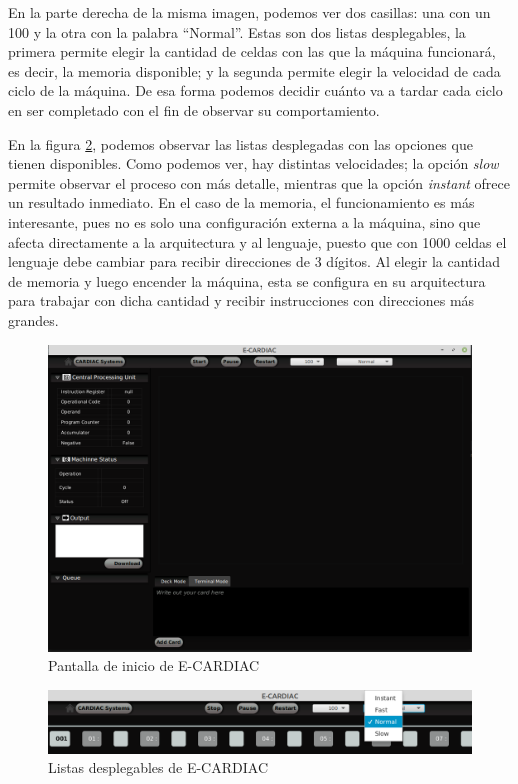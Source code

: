 \documentclass[letterpaper,12pt,oneside]{book}
\begin{document}
	En la
	parte derecha de la misma imagen, podemos ver dos casillas: una con un 100 y la otra con la palabra ``Normal''. Estas son dos listas desplegables, la primera permite 
	elegir la cantidad de celdas con las que la máquina funcionará, es decir, la memoria disponible; y la segunda permite elegir la velocidad de
	cada ciclo de la máquina. De esa
	forma podemos decidir cuánto va a tardar cada ciclo en ser completado con el fin de observar su comportamiento.
 
    En la figura \ref{fig:listasDespCardiac},
	podemos observar las listas desplegadas con las opciones que tienen disponibles. Como podemos ver, hay distintas velocidades; la opción 	
	\textit{slow} permite observar el proceso con más detalle, mientras que la opción \textit{instant} ofrece un resultado inmediato. En el caso de la memoria, el funcionamiento es más interesante, pues
	no es solo una configuración externa a la máquina, sino que afecta directamente a la arquitectura y al lenguaje, puesto que con 1000 celdas el lenguaje
	debe cambiar para recibir direcciones de 3 dígitos. Al elegir la cantidad de memoria y luego encender la máquina, esta se configura en su arquitectura para trabajar con dicha
	cantidad y recibir instrucciones con direcciones más grandes.

	\begin{figure}[h]
 			\centering
			\includegraphics[scale=0.4]{media/ECARDIAC/ECARDIAC_P1.png}
			\caption{Pantalla de inicio de E-CARDIAC}
			\label{fig:iniECardiac}
	\end{figure}


	\begin{figure}[H]
 			\centering
			\includegraphics[scale=0.45]{media/ECARDIAC/ecardiac_lista_velocidad.png}
			\caption{Listas desplegables de E-CARDIAC}
			\label{fig:listasDespCardiac}
	\end{figure}
\end{document}
